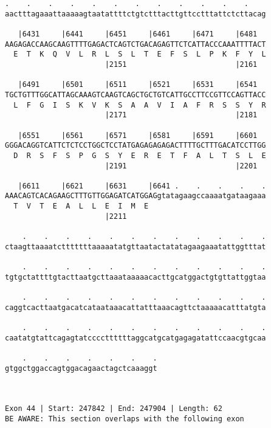 \documentclass{article}
\begin{document}
\begin{Verbatim}
.    .    .    .    .    .    .    .    .    .    .    .    
aactttagaaattaaaaagtaatattttctgtctttacttgttcctttattctcttacag
                                                            
   |6431     |6441     |6451     |6461     |6471     |6481  
AAGAGACCAAGCAAGTTTTGAGACTCAGTCTGACAGAGTTCTCATTACCCAAATTTTACT
  E  T  K  Q  V  L  R  L  S  L  T  E  F  S  L  P  K  F  Y  L
                       |2151                         |2161  
  
   |6491     |6501     |6511     |6521     |6531     |6541  
TGCTGTTTGGCATTAGCAAAGTCAAGTCAGCTGCTGTCATTGCCTTCCGTTCCAGTTACC
  L  F  G  I  S  K  V  K  S  A  A  V  I  A  F  R  S  S  Y  R
                       |2171                         |2181  
  
   |6551     |6561     |6571     |6581     |6591     |6601  
GGGACAGGTCATTCTCTCCTGGCTCCTATGAGAGAGAGACTTTTGCTTTGACATCCTTGG
  D  R  S  F  S  P  G  S  Y  E  R  E  T  F  A  L  T  S  L  E
                       |2191                         |2201  
  
   |6611     |6621     |6631     |6641 .    .    .    .    .
AAACAGTCACAGAAGCTTTGTTGGAGATCATGGAGgtatagaagccaaaatgataagaaa
  T  V  T  E  A  L  L  E  I  M  E                           
                       |2211                                
  
    .    .    .    .    .    .    .    .    .    .    .    .
ctaagttaaaatctttttttaaaaatatgttaatactatatagaagaaatattggtttat
                                                            
    .    .    .    .    .    .    .    .    .    .    .    .
tgtgctattttgtacttaatgcttaaataaaaacacttgcatggactgtgttattggtaa
                                                            
    .    .    .    .    .    .    .    .    .    .    .    .
caggtcacttaatgacatcataataaacattatttaaacagttctaaaaacatttatgta
                                                            
    .    .    .    .    .    .    .    .    .    .    .    .
caatatgtattcagagtatccccttttttaggcatgcatgagagatattccaacgtgcaa
                                                            
    .    .    .    .    .    .    .
gtggctggaccagtggacagaactagctcaaaggt
                                   
                                   
 
Exon 44 | Start: 247842 | End: 247904 | Length: 62
BE AWARE: This section overlaps with the following exon




\end{Verbatim}
\end{document}
